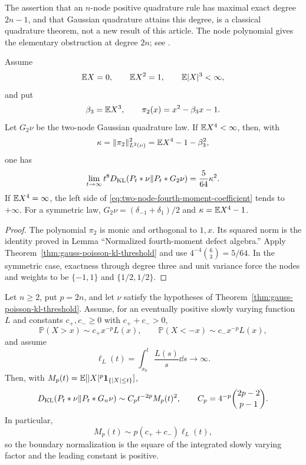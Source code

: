 \begin{remark}
The assertion that an \(n\)-node positive quadrature rule has maximal exact
degree \(2n-1\), and that Gaussian quadrature attains this degree, is a
classical quadrature theorem, not a new result of this article.  The node
polynomial gives the elementary obstruction at degree \(2n\); see
\cite{GolubWelsch1969GaussQuadrature}.
\end{remark}

\begin{corollary}
\label{cor:two-node-gauss-fourth-moment}
Assume
\[
 \mathbb{E} X=0,\qquad \mathbb{E} X^2=1,\qquad \mathbb{E}|X|^3<\infty,
\]
and put
\[
 \beta_3=\mathbb{E} X^3,\qquad
 \pi_2(x)=x^2-\beta_3x-1.
\]
Let \(G_2\nu\) be the two-node Gaussian quadrature law.  If
\(\mathbb{E} X^4<\infty\), then, with
\[
 \kappa=\|\pi_2\|_{L^2(\nu)}^2
 =\mathbb{E} X^4-1-\beta_3^2,
\]
one has
\begin{equation}\label{eq:two-node-fourth-moment-coefficient}
 \lim_{t\to\infty}t^8D_{\rm KL}(P_t*\nu\|P_t*G_2\nu)
 =\frac5{64}\kappa^2.
\end{equation}
If \(\mathbb{E} X^4=\infty\), the left side of
\eqref{eq:two-node-fourth-moment-coefficient} tends to \(+\infty\).  For a
symmetric law,
\(G_2\nu=(\delta_{-1}+\delta_1)/2\) and
\(\kappa=\mathbb{E} X^4-1\).
\end{corollary}

\begin{proof}
The polynomial \(\pi_2\) is monic and orthogonal to \(1,x\).  Its squared
norm is the identity proved in Lemma ``Normalized
fourth-moment defect algebra.''  Apply
Theorem~\ref{thm:gauss-poisson-kl-threshold} and use
\(4^{-4}\binom63=5/64\).  In the symmetric case, exactness through degree
three and unit variance force the nodes and weights to be
\(\{-1,1\}\) and \(\{1/2,1/2\}\).
\end{proof}

\begin{theorem}
\label{thm:gauss-regular-variation-square-law}
Let \(n\ge2\), put \(p=2n\), and let \(\nu\) satisfy the hypotheses of
Theorem~\ref{thm:gauss-poisson-kl-threshold}.  Assume, for an eventually
positive slowly varying function \(L\) and constants \(c_+,c_-\ge0\) with
\(c_++c_->0\),
\[
 \mathbb P(X>x)\sim c_+x^{-p}L(x),\qquad
 \mathbb P(X<-x)\sim c_-x^{-p}L(x),
\]
and assume
\[
 \ell_L(t)=\int_{x_0}^t\frac{L(s)}s\dd s\longrightarrow\infty.
\]
Then, with
\(M_p(t)=\mathbb{E}[|X|^p\mathbf1_{\{|X|\le t\}}]\),
\begin{equation}\label{eq:gauss-regular-variation-square-law}
 D_{\rm KL}(P_t*\nu\|P_t*G_n\nu)
 \sim C_p t^{-2p}M_p(t)^2,
 \qquad C_p=4^{-p}\binom{2p-2}{p-1}.
\end{equation}
In particular,
\[
 M_p(t)\sim p(c_++c_-)\ell_L(t),
\]
so the boundary normalization is the square of the integrated slowly
varying factor and the leading constant is positive.
\end{theorem}

